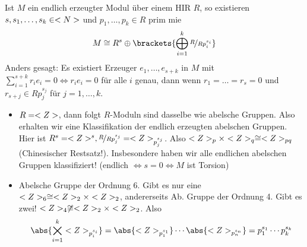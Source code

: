 \begin{proposition}
	Ist $M$ ein endlich erzeugter Modul über einem HIR $R$, so existieren $s, s_1, \dots, s_k \in <N>$ und $p_1, \dots, p_k \in R$ prim mie 
	\begin{align*}
	M \cong R^s \oplus \brackets{\bigoplus_{i=1}^k \lnkset{R}{Rp_i^{s_i}}}
	\end{align*}
	Anders gesagt: Es existiert Erzeuger $e_1, \dots, e_{s+k}$ in $M$ mit $\sum_{i=1}^{s+k} r_i e_i = 0 \Leftrightarrow r_i e_i = 0$ für alle $i$ genau, dann wenn $r_1 = \dots = r_s = 0$ und $r_{s+j} \in Rp_j^{s_j}$ für $j = 1, \dots, k$. 
\end{proposition}
\begin{example}
	\begin{itemize}
		\item $R = <Z>$, dann folgt $R$-Moduln sind dasselbe wie abelsche Gruppen. Also erhalten wir eine Klassifikation der endlich erzeugten abelschen Gruppen. Hier ist $R^s = \Z^s, \lnkset{R}{Rp_j^{s_j}} = \Z_{p_j^{s_j}}$. Also $<Z>_p \times <Z>_q \cong <Z>_{pq}$ (Chinesischer Restsatz!). Insbesondere haben wir alle endlichen abelschen Gruppen klassifiziert! (endlich $\Leftrightarrow s = 0 \Leftrightarrow M$ ist Torsion)
		\item Abelsche Gruppe der Ordnung 6. Gibt es nur eine $<Z>_6 \cong <Z>_2 \times <Z>_2$, andererseits Ab. Gruppe der Ordnung 4. Gibt es zwei! $<Z>_4 \not\cong <Z>_2 \times <Z>_2$. Also
		\begin{align*}
		\abs{\bigtimes_{i=1}^k\Z_{p_i^{s_i}}} = \abs{\Z_{p_1^{s_1}}} \cdots \abs{\Z_{p_n^{s_n}}} = p_1^{s_1} \cdots p_k^{s_k}
		\end{align*}
	\end{itemize}
\end{example}
